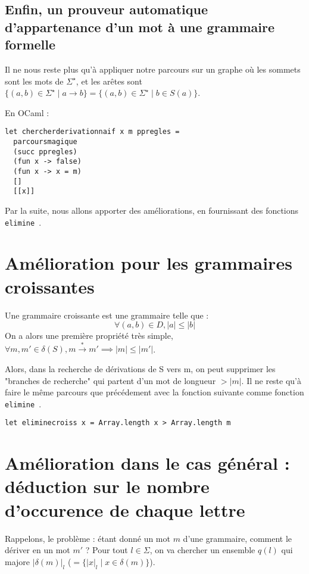 \documentclass[a4paper,12pt]{article}
\newcommand{\norm}[1]{\lvert #1 \rvert}
\begin{document}
\subsection{Enfin, un prouveur automatique d'appartenance d'un mot à une grammaire formelle}

Il ne nous reste plus qu'à appliquer notre parcours sur un graphe où les sommets sont les mots de $\Sigma^\star$, et les
arêtes sont $\{(a,b) \in  \Sigma^\star \mid a \rightarrow b\} = \{(a,b) \in \Sigma^\star \mid b \in S(a)\}$.

En OCaml : 
{\color{DarkBlue}\begin{verbatim}
let chercherderivationnaif x m ppregles = 
  parcoursmagique
  (succ ppregles)
  (fun x -> false)
  (fun x -> x = m)
  []
  [[x]]
\end{verbatim}}

Par la suite, nous allons apporter des améliorations, en fournissant des fonctions \texttt{ elimine }.

\section{Amélioration pour les grammaires croissantes}

Une grammaire croissante est une grammaire telle que :
\begin{equation}\forall (a,b) \in D, \norm{a} \leq \norm{b} \end{equation}
On a alors une première propriété très simple, $\forall m, m' \in \delta (S), m \overset{*}{\rightarrow} m' \implies \norm{m} \leq \norm{m'}$.

Alors, dans la recherche de dérivations de S vers m, on peut supprimer les "branches de recherche" qui partent d'un mot de longueur $> \norm{m}$.
Il ne reste qu'à faire le même parcours que précédement avec la fonction suivante comme fonction \texttt{ elimine }.
{\color{DarkBlue}\begin{verbatim}
let eliminecroiss x = Array.length x > Array.length m
\end{verbatim}}

\section{Amélioration dans le cas général : déduction sur le nombre d'occurence de chaque lettre}
Rappelons, le problème : étant donné un mot $m$ d'une grammaire, comment le dériver en un mot $m'$ ?
Pour tout $l \in \Sigma$, on va chercher un ensemble $q(l)$ qui majore $\norm{\delta(m)}_l$ ($=\{\norm{x}_l \mid x \in \delta(m)\}$).
\end{document}
